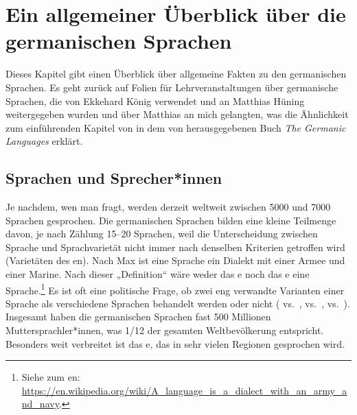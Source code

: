 \chapter{Ein allgemeiner Überblick über die germanischen Sprachen}

Dieses Kapitel gibt einen Überblick über allgemeine Fakten zu den germanischen Sprachen. Es geht zurück auf
Folien für Lehrveranstaltungen über germanische Sprachen, die von Ekkehard König verwendet und an
Matthias Hüning weitergegeben wurden und über Matthias an mich gelangten, was die Ähnlichkeit zum einführenden
Kapitel von \citet{HvDA94a} in dem von \citet{KvdA94a-ed} herausgegebenen Buch \emph{The Germanic Languages} erklärt.



\section{Sprachen und Sprecher*innen}

Je nachdem, wen man fragt, werden derzeit weltweit zwischen 5000 und 7000 Sprachen gesprochen. Die
germanischen Sprachen bilden eine kleine Teilmenge davon, je nach Zählung 15--20 Sprachen, weil die Unterscheidung zwischen Sprache und Sprachvarietät nicht immer nach denselben Kriterien getroffen wird (\zb Varietäten des en).
Nach Max \citet[]{Weinreich45a-u} ist eine Sprache ein Dialekt mit einer Armee und einer
Marine. Nach dieser „Definition“ wäre weder das e noch das e eine Sprache.\footnote{%
Siehe \citet[]{Weinreich45a-u} zum en: \url{https://en.wikipedia.org/wiki/A_language_is_a_dialect_with_an_army_and_navy}.
}
Es ist oft eine politische Frage, ob zwei eng verwandte Varianten einer Sprache als verschiedene Sprachen behandelt werden oder nicht ( vs.\ ,  vs.\ ,  vs.\ ).
Insgesamt haben die germanischen Sprachen fast 500 Millionen Muttersprachler*innen, was 1/12 der gesamten Weltbevölkerung
entspricht. Besonders weit verbreitet ist das e, das in sehr vielen Regionen
gesprochen wird.


